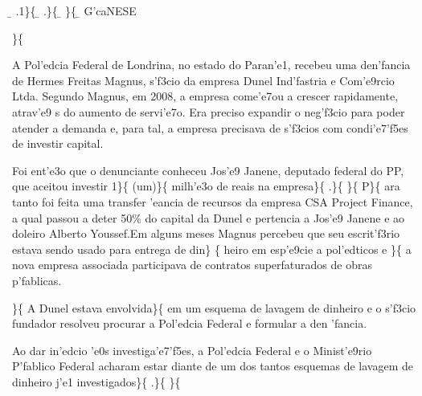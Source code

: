 \ltrch{} \b{} .1\}\{\rtlch{}
\ab{} \ltrch{} \b{} .\}\{\rtlch{}
\ab{} \ltrch{} \b{}
\}\{\rtlch{} \ab{} \ltrch{}
\b{} G'caNESE \par \}\{\rtlch{}
 \ltrch{}  \par \tab A Pol'edcia
Federal de Londrina, no estado do Paran'e1, recebeu uma den'fancia de
Hermes Freitas Magnus, s'f3cio da empresa Dunel Ind'fastria e Com'e9rcio
Ltda. Segundo Magnus, em 2008, a empresa come'e7ou a crescer
rapidamente, atrav'e9 s do aumento de servi'e7o. Era preciso expandir o
neg'f3cio para poder atender a demanda e, para tal, a empresa precisava
de s'f3cios com condi'e7'f5es de investir capital. \par \tab Foi ent'e3o
que o denunciante conheceu Jos'e9 Janene, deputado federal do PP, que
aceitou investir 1\}\{\rtlch{}  \ltrch{} 
(um)\}\{\rtlch{}  \ltrch{} 
milh'e3o de reais na empresa\}\{ \rtlch{}  \ltrch{}
 .\}\{\rtlch{}  \ltrch{}
 \}\{\rtlch{}  \ltrch{}
 P\}\{\rtlch{}  \ltrch{}
 ara tanto foi feita uma transfer
'eancia de recursos da empresa CSA Project Finance, a qual passou a
deter 50\% do capital da Dunel e pertencia a Jos'e9 Janene e ao doleiro
Alberto Youssef.\tab Em alguns meses Magnus percebeu que seu
escrit'f3rio estava sendo usado para entrega de din\} \{\rtlch{} 
\ltrch{}  heiro em esp'e9cie a pol'edticos e
\}\{\rtlch{}  \ltrch{}  a nova
empresa associada participava de contratos superfaturados de obras
p'fablicas. \par \}\{\rtlch{}  \ltrch{}  \tab A
Dunel estava envolvida\}\{\rtlch{}  \ltrch{}
 em um esquema de lavagem de dinheiro e
o s'f3cio fundador resolveu procurar a Pol'edcia Federal e formular a
den 'fancia. \par \tab Ao dar in'edcio 'e0s investiga'e7'f5es, a
Pol'edcia Federal e o Minist'e9rio P'fablico Federal acharam estar
diante de um dos tantos esquemas de lavagem de dinheiro j'e1
investigados\}\{\rtlch{}  \ltrch{}  .\}\{
\rtlch{}  \ltrch{} 
\}\{\rtlch{}  \ltrch{} 
